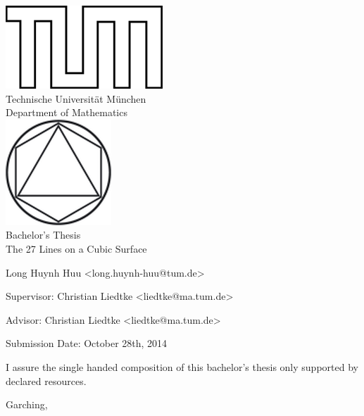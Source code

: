 \begin{titlepage}
\begin{center}
\includegraphics{TUMlschwarz.png}\\[3mm]
\sf
{\Large
  Technische Universit\"at M\"unchen\\[5mm]
  Department of Mathematics\\[8mm]
}
\normalsize
\includegraphics{TUMlMschwarz.png}\\[15mm]

Bachelor's Thesis\\[15mm]

{\Huge
  The 27 Lines on a Cubic Surface
}
\bigskip

\normalsize

Long Huynh Huu <long.huynh-huu@tum.de>
\end{center}
\vspace*{75mm}

Supervisor: Christian Liedtke <liedtke@ma.tum.de>
\medskip

Advisor: Christian Liedtke <liedtke@ma.tum.de>
\medskip

Submission Date: October 28th, 2014

\end{titlepage}


\vspace*{150mm}

I assure the single handed composition of this bachelor's thesis only supported by declared resources.
\bigskip

Garching, 
\newpage
